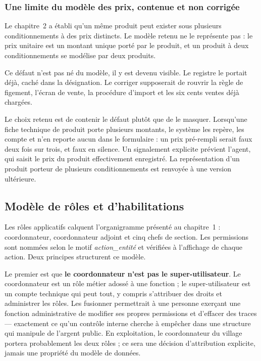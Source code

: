 \subsubsection{Une limite du modèle des prix, contenue et non corrigée}

Le chapitre~2 a établi qu'un même produit peut exister sous plusieurs conditionnements à des prix distincts. Le modèle retenu ne le représente pas : le prix unitaire est un montant unique porté par le produit, et un produit à deux conditionnements se modélise par deux produits.

Ce défaut n'est pas né du modèle, il y est devenu visible. Le registre le portait déjà, caché dans la désignation. Le corriger supposerait de rouvrir la règle de figement, l'écran de vente, la procédure d'import et les six cents ventes déjà chargées.

Le choix retenu est de contenir le défaut plutôt que de le masquer. Lorsqu'une fiche technique de produit porte plusieurs montants, le système les repère, les compte et n'en reporte aucun dans le formulaire : un prix pré-rempli serait faux deux fois sur trois, et faux en silence. Un signalement explicite prévient l'agent, qui saisit le prix du produit effectivement enregistré. La représentation d'un produit porteur de plusieurs conditionnements est renvoyée à une version ultérieure.

\subsection{Modèle de rôles et d'habilitations}

Les rôles applicatifs calquent l'organigramme présenté au chapitre~1 : coordonnateur, coordonnateur adjoint et cinq chefs de section. Les permissions sont nommées selon le motif \emph{action\_entité} et vérifiées à l'affichage de chaque action. Deux principes structurent ce modèle.

Le premier est que \textbf{le coordonnateur n'est pas le super-utilisateur}. Le coordonnateur est un rôle métier adossé à une fonction ; le super-utilisateur est un compte technique qui peut tout, y compris s'attribuer des droits et administrer les rôles. Les fusionner permettrait à une personne exerçant une fonction administrative de modifier ses propres permissions et d'effacer des traces --- exactement ce qu'un contrôle interne cherche à empêcher dans une structure qui manipule de l'argent public. En exploitation, le coordonnateur du village portera probablement les deux rôles ; ce sera une décision d'attribution explicite, jamais une propriété du modèle de données.

